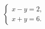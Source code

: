\begin{ex}
	\begin{condition}
		\( \left\{
		\begin{array}{l}
			x-y=2,\\
			x+y=6.
		\end{array}
		\right. \)
	\end{condition}
\end{ex}